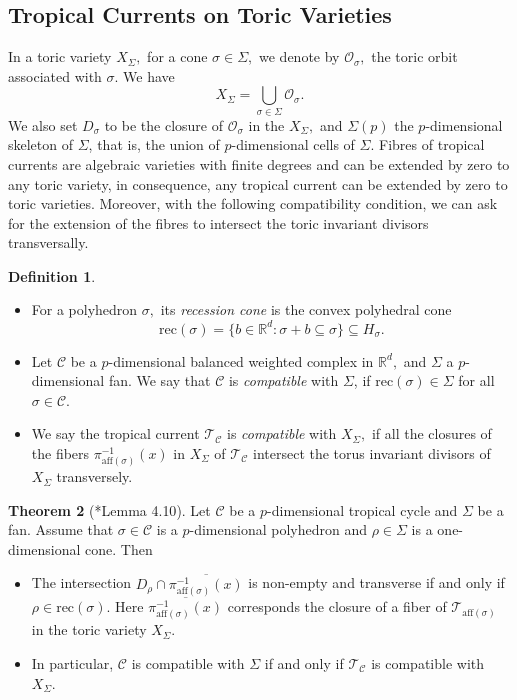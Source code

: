 \documentclass[11pt]{amsart}
\theoremstyle{definition}
\newtheorem{theorem}{Theorem}[section]
\newtheorem{definition}[theorem]{Definition}
\newcommand{\R}{\mathbb{R}}
\newcommand{\cO}{\mathcal{O}}
\newcommand{\cC}{\mathcal{C}}
\newcommand{\sT}{\mathscr{T}}
\begin{document}
\subsection{Tropical Currents on Toric Varieties}
In a toric variety $X_{\Sigma},$ for a cone $\sigma\in \Sigma,$ we denote by $\cO_{\sigma},$ the toric orbit associated with $\sigma.$ We have 
$$
X_{\Sigma} = \bigcup_{\sigma \in \Sigma} \cO_{\sigma}.
$$
We also set $D_{\sigma}$ to be the closure of $\cO_{\sigma}$ in the $X_{\Sigma},$ and $\Sigma(p)$  the $p$-dimensional skeleton of $\Sigma$, that is, the union of $p$-dimensional cells of $\Sigma$. Fibres of tropical currents are algebraic varieties with finite degrees and can be extended by zero to any toric variety, in consequence, any tropical current can be extended by zero to toric varieties. Moreover, with the following compatibility condition, we can ask for the extension of the fibres to intersect the toric invariant divisors transversally. 
\begin{definition}
\begin{itemize}
    \item [(a)] For a polyhedron $\sigma,$ its \emph{recession cone} is the convex polyhedral cone 
    $$
 \textrm{rec}(\sigma) = \{ b\in \R^d: \sigma+b \subseteq \sigma\} \subseteq H_{\sigma}.
    $$
       \item [(b)] Let $\cC$ be a $p$-dimensional balanced weighted complex in $\R^d,$ and $\Sigma$ a $p$-dimensional fan. We say that $\cC$ is \emph{compatible} with $\Sigma$, if $\textrm{rec}(\sigma) \in \Sigma$ for all $\sigma \in \cC.$
       
       \item [(c)] We say the tropical current $\sT_{\cC}$ is \emph{compatible} with $X_{\Sigma},$ if all the closures of the fibers $\pi_{\text{aff}(\sigma)}^{-1}(x)$ in $X_{\Sigma}$ of $\sT_{\cC}$ intersect the torus invariant divisors of $X_{\Sigma}$ transversely. 
\end{itemize}
\end{definition}


\begin{theorem}[\cite{BH}*{Lemma 4.10}]\label{thm:transverse-fiber}
  Let $\cC$ be a $p$-dimensional tropical cycle and $\Sigma$ be a fan. Assume that $\sigma \in \cC$ is a $p$-dimensional polyhedron and $\rho \in \Sigma$ is a one-dimensional cone. Then 
  \begin{itemize}
      \item [(a)] The intersection $D_{\rho} \cap \overline{\pi^{-1}_{\textrm{aff}(\sigma)}(x)}$ is non-empty and transverse if and only if $\rho \in \textrm{rec}(\sigma).$ Here $\overline{\pi^{-1}_{\textrm{aff}(\sigma)}(x)}$ corresponds the closure of a fiber of $\sT_{\text{aff}(\sigma)}$ in the toric variety $X_{\Sigma}.$ 
  
      \item [(b)] In particular, $\cC$ is compatible with $\Sigma$ if and only if $\sT_{\cC}$ is compatible with $X_{\Sigma}.$
       \end{itemize}     
\end{theorem}
\end{document}
